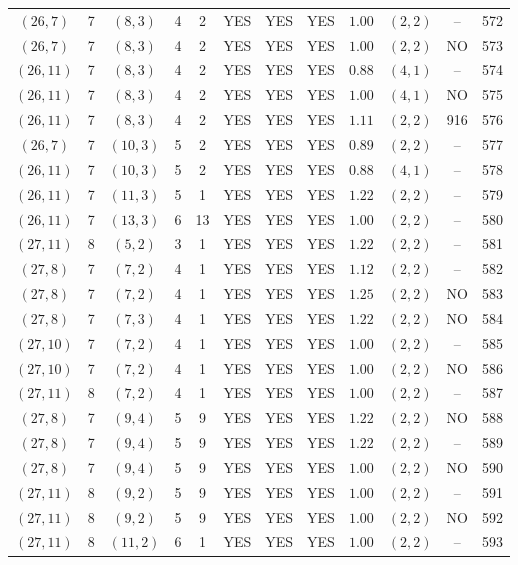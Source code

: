 \begin{longtable}{|c|c|c|c|c|c|c|c|c|c|c|c|}
$(26,7)$ & 7 & $(8,3)$ & 4 & 2 & YES & YES & YES & $1.00$ & $(2,2)$ & -- & 572\\
$(26,7)$ & 7 & $(8,3)$ & 4 & 2 & YES & YES & YES & $1.00$ & $(2,2)$ & NO & 573\\
$(26,11)$ & 7 & $(8,3)$ & 4 & 2 & YES & YES & YES & $0.88$ & $(4,1)$ & -- & 574\\
$(26,11)$ & 7 & $(8,3)$ & 4 & 2 & YES & YES & YES & $1.00$ & $(4,1)$ & NO & 575\\
$(26,11)$ & 7 & $(8,3)$ & 4 & 2 & YES & YES & YES & $1.11$ & $(2,2)$ & 916 & 576\\
$(26,7)$ & 7 & $(10,3)$ & 5 & 2 & YES & YES & YES & $0.89$ & $(2,2)$ & -- & 577\\
$(26,11)$ & 7 & $(10,3)$ & 5 & 2 & YES & YES & YES & $0.88$ & $(4,1)$ & -- & 578\\
$(26,11)$ & 7 & $(11,3)$ & 5 & 1 & YES & YES & YES & $1.22$ & $(2,2)$ & -- & 579\\
$(26,11)$ & 7 & $(13,3)$ & 6 & 13 & YES & YES & YES & $1.00$ & $(2,2)$ & -- & 580\\
$(27,11)$ & 8 & $(5,2)$ & 3 & 1 & YES & YES & YES & $1.22$ & $(2,2)$ & -- & 581\\
$(27,8)$ & 7 & $(7,2)$ & 4 & 1 & YES & YES & YES & $1.12$ & $(2,2)$ & -- & 582\\
$(27,8)$ & 7 & $(7,2)$ & 4 & 1 & YES & YES & YES & $1.25$ & $(2,2)$ & NO & 583\\
$(27,8)$ & 7 & $(7,3)$ & 4 & 1 & YES & YES & YES & $1.22$ & $(2,2)$ & NO & 584\\
$(27,10)$ & 7 & $(7,2)$ & 4 & 1 & YES & YES & YES & $1.00$ & $(2,2)$ & -- & 585\\
$(27,10)$ & 7 & $(7,2)$ & 4 & 1 & YES & YES & YES & $1.00$ & $(2,2)$ & NO & 586\\
$(27,11)$ & 8 & $(7,2)$ & 4 & 1 & YES & YES & YES & $1.00$ & $(2,2)$ & -- & 587\\
$(27,8)$ & 7 & $(9,4)$ & 5 & 9 & YES & YES & YES & $1.22$ & $(2,2)$ & NO & 588\\
$(27,8)$ & 7 & $(9,4)$ & 5 & 9 & YES & YES & YES & $1.22$ & $(2,2)$ & -- & 589\\
$(27,8)$ & 7 & $(9,4)$ & 5 & 9 & YES & YES & YES & $1.00$ & $(2,2)$ & NO & 590\\
$(27,11)$ & 8 & $(9,2)$ & 5 & 9 & YES & YES & YES & $1.00$ & $(2,2)$ & -- & 591\\
$(27,11)$ & 8 & $(9,2)$ & 5 & 9 & YES & YES & YES & $1.00$ & $(2,2)$ & NO & 592\\
$(27,11)$ & 8 & $(11,2)$ & 6 & 1 & YES & YES & YES & $1.00$ & $(2,2)$ & -- & 593\\

\end{longtable}
